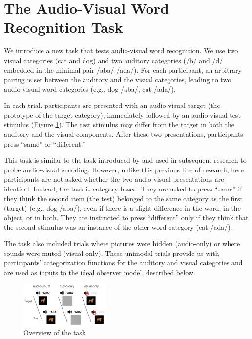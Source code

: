 \documentclass[10pt,letterpaper]{article}
\begin{document}
\section{The Audio-Visual Word Recognition Task}

We introduce a new task that tests audio-visual word recognition. We use two visual categories (cat and dog) and two auditory categories (/b/ and /d/ embedded in the minimal pair /aba/-/ada/). For each participant, an arbitrary pairing is set between the auditory and the visual categories, leading to two audio-visual word categories (e.g., dog-/aba/, cat-/ada/).

In each trial, participants are presented with an audio-visual target (the prototype of the target category), immediately followed by an audio-visual test stimulus (Figure \ref{fig:task}). The test stimulus may differ from the target in both the auditory and the visual components.  After these two presentations, participants press ``same'' or ``different.''

This task is similar to the task introduced by  and used in subsequent research to probe audio-visual encoding. However, unlike this previous line of research, here participants are not asked whether the two audio-visual presentations are identical. Instead, the task is category-based: They are asked to press ``same'' if they think the second item (the test) belonged to the same category as the first (target) (e.g.,  dog-/aba/), even if there is a slight difference in the word, in the object, or in both. They are instructed to press ``different'' only if they think that the second stimulus was an instance of the other word category (cat-/ada/).

The task also included trials where pictures were hidden (audio-only) or where sounds were muted (visual-only). These unimodal trials provide us with participants' categorization functions for the auditory and visual categories and are used as inputs to the ideal observer model, described below.

\begin{figure}[tp]
\centering
\includegraphics[width=0.4\textwidth]{pictures/task.png}
\caption{Overview of the task}
\label{fig:task}
\end{figure}
\end{document}
